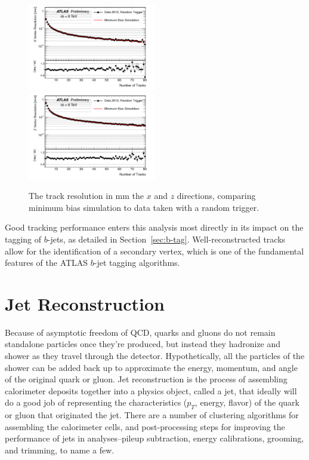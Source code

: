 \begin{figure}
	\includegraphics[width=0.5\textwidth]{ReconstructionPerformance/images/track_perf3.pdf}
	\includegraphics[width=0.5\textwidth]{ReconstructionPerformance/images/track_perf4.pdf}
	\label{fig:track_perfB}  
	\caption{The track resolution in mm the $x$ and $z$ directions, comparing minimum bias simulation to data taken with a random trigger.}
\end{figure}

Good tracking performance enters this analysis most directly in its impact on the tagging of $b$-jets, as detailed in Section~\ref{sec:b-tag}.  Well-reconstructed tracks allow for the identification of a secondary vertex, which is one of the fundamental features of the ATLAS $b$-jet tagging algorithms.





\section{Jet Reconstruction}
\label{sec:jet_reco}
Because of asymptotic freedom of QCD, quarks and gluons do not remain standalone particles once they're produced, but instead they hadronize and shower as they travel through the detector.  Hypothetically, all the particles of the shower can be added back up to approximate the energy, momentum, and angle of the original quark or gluon.  Jet reconstruction is the process of assembling calorimeter deposits together into a physics object, called a jet, that ideally will do a good job of representing the characteristics ($p_T$, energy, flavor) of the quark or gluon that originated the jet.  There are a number of clustering algorithms for assembling the calorimeter cells, and post-processing steps for improving the performance of jets in analyses--pileup subtraction, energy calibrations, grooming, and trimming, to name a few.  


